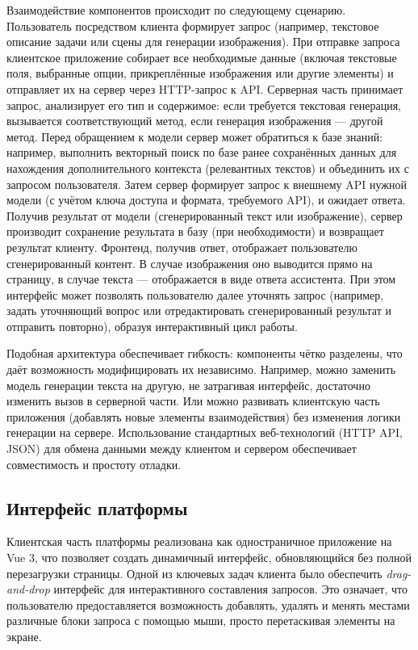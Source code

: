 Взаимодействие компонентов происходит по следующему сценарию. Пользователь посредством клиента формирует запрос (например, текстовое описание задачи или сцены для генерации изображения). При отправке запроса клиентское приложение собирает все необходимые данные (включая текстовые поля, выбранные опции, прикреплённые изображения или другие элементы) и отправляет их на сервер через HTTP-запрос к API. Серверная часть принимает запрос, анализирует его тип и содержимое: если требуется текстовая генерация, вызывается соответствующий метод, если генерация изображения — другой метод. Перед обращением к модели сервер может обратиться к базе знаний: например, выполнить векторный поиск по базе ранее сохранённых данных для нахождения дополнительного контекста (релевантных текстов) и объединить их с запросом пользователя. Затем сервер формирует запрос к внешнему API нужной модели (с учётом ключа доступа и формата, требуемого API), и ожидает ответа. Получив результат от модели (сгенерированный текст или изображение), сервер производит сохранение результата в базу (при необходимости) и возвращает результат клиенту. Фронтенд, получив ответ, отображает пользователю сгенерированный контент. В случае изображения оно выводится прямо на страницу, в случае текста — отображается в виде ответа ассистента. При этом интерфейс может позволять пользователю далее уточнять запрос (например, задать уточняющий вопрос или отредактировать сгенерированный результат и отправить повторно), образуя интерактивный цикл работы.

Подобная архитектура обеспечивает гибкость: компоненты чётко разделены, что даёт возможность модифицировать их независимо. Например, можно заменить модель генерации текста на другую, не затрагивая интерфейс, достаточно изменить вызов в серверной части. Или можно развивать клиентскую часть приложения (добавлять новые элементы взаимодействия) без изменения логики генерации на сервере. Использование стандартных веб-технологий (HTTP API, JSON) для обмена данными между клиентом и сервером обеспечивает совместимость и простоту отладки.

\subsection{Интерфейс платформы}

Клиентская часть платформы реализована как одностраничное приложение на Vue 3, что позволяет создать динамичный интерфейс, обновляющийся без полной перезагрузки страницы. Одной из ключевых задач клиента было обеспечить \textit{drag-and-drop} интерфейс для интерактивного составления запросов. Это означает, что пользователю предоставляется возможность добавлять, удалять и менять местами различные блоки запроса с помощью мыши, просто перетаскивая элементы на экране.


